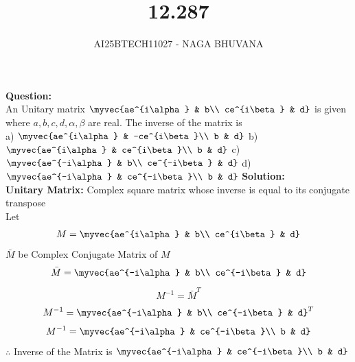 \documentclass{beamer}
\title{12.287}
\author{AI25BTECH11027 - NAGA BHUVANA}
\numberwithin{equation}{section}
\begin{document}
{\let\newpage\relax\maketitle}
\renewcommand{\thefigure}{\theenumi}
\renewcommand{\thetable}{\theenumi}

\noindent
		\textbf{Question:}\\
An Unitary matrix   $\myvec{ae^{i\alpha} & b\\ ce^{i\beta} & d}$ is given where $a,b,c,d,\alpha,\beta$ are real. The inverse of the matrix is\\
    a) $\myvec{ae^{i\alpha} & -ce^{i\beta}\\ b & d}$ 
    b) $\myvec{ae^{i\alpha} & ce^{i\beta}\\ b & d}$ 
    c) $\myvec{ae^{-i\alpha} & b\\ ce^{-i\beta} & d}$ 
    d) $\myvec{ae^{-i\alpha} & ce^{-i\beta}\\ b & d}$ 
\textbf{Solution:}\\
\textbf{Unitary Matrix:} Complex square matrix whose inverse is equal to its conjugate transpose\\
Let \begin{align}
    M=\myvec{ae^{i\alpha} & b\\ ce^{i\beta} & d}
\end{align}
$\bar{M}$ be Complex Conjugate Matrix of $M$\\
\begin{align}
    \bar{M}=\myvec{ae^{-i\alpha} & b\\ ce^{-i\beta} & d}
\end{align}
\begin{align}
    M^{-1}=\bar{M}^{T}
\end{align}
\begin{align}
    M^{-1}=\myvec{ae^{-i\alpha} & b\\ ce^{-i\beta} & d}^T
\end{align}
\begin{align}
    M^{-1}=\myvec{ae^{-i\alpha} & ce^{-i\beta}\\ b & d}
\end{align}
$\therefore$ Inverse of the Matrix is $\myvec{ae^{-i\alpha} & ce^{-i\beta}\\ b & d}$
\end{document}
